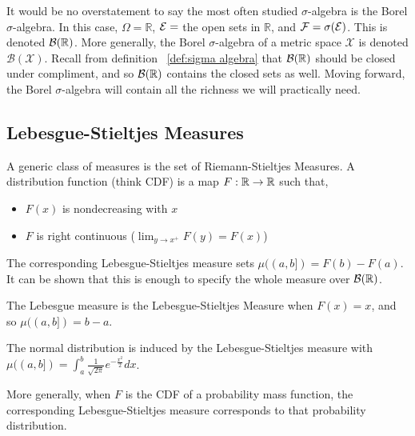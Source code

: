 It would be no overstatement to say the most often studied $\sigma$-algebra is the 
Borel $\sigma$-algebra. In this case, $\Omega = \mathbb R$, $\mathcal E = $ the open sets in 
$\mathbb R$, and $\mathcal F = \sigma(\mathcal E)$. This is denoted $\mathcal B(\mathbb R)$. More generally, the Borel 
$\sigma$-algebra of a metric space $\mathcal X$ is denoted $\mathcal B(\mathcal X)$. 
Recall from definition ~\ref{def:sigma algebra} that $\mathcal B(\mathbb R)$ should be closed under 
compliment, and so $\mathcal B(\mathbb R)$ contains the closed sets as well. Moving forward, 
the Borel $\sigma$-algebra will contain all the richness we will practically need. 


\subsection{Lebesgue-Stieltjes Measures}

A generic class of measures is the set of Riemann-Stieltjes Measures. 
A distribution function (think CDF) is a map $F : \mathbb R \to \mathbb R$ such that, 
\begin{itemize}
    \item $F(x)$ is nondecreasing with $x$
    \item $F$ is right continuous ($\lim_{y \to x^+}F(y) = F(x)$)
\end{itemize}
The corresponding Lebesgue-Stieltjes measure sets $\mu((a,b]) = F(b) - F(a)$. 
It can be shown that this is enough to specify the whole measure over $\mathcal B(\mathbb R)$. 

\begin{example}
The Lebesgue measure is the Lebesgue-Stieltjes Measure when $F(x) = x$, and so 
$\mu((a,b]) = b-a$. 
\end{example}

\begin{example}
    The normal distribution is induced by the Lebesgue-Stieltjes measure with 
    $\mu((a,b]) = \int_a^b \frac{1}{\sqrt{2\pi}}e^{-\frac{x^2}{2}}dx$.
\end{example}

\begin{example}
    More generally, when $F$ is the CDF of a probability mass function, the corresponding 
    Lebesgue-Stieltjes measure corresponds to that probability distribution.
\end{example}


